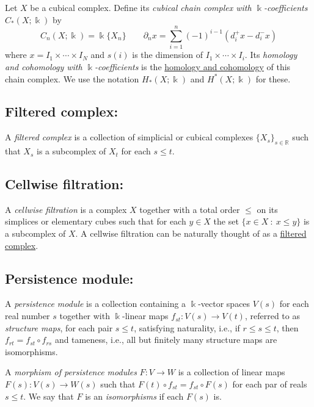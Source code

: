 \documentclass{amsart}
\begin{document}
	Let $X$ be a cubical complex. Define its \textit{cubical chain complex with $\Bbbk$-coefficients} $C_*(X; \Bbbk)$ by 
	\begin{equation*}
	C_n(X; \Bbbk) = \Bbbk\{X_n\} \qquad \partial_n x = \sum_{i = 1}^{n} (-1)^{i-1}(d^+_i x - d^-_i x)
	\end{equation*}
	where $x = I_1 \times \cdots \times I_N$ and $s(i)$ is the dimension of $I_1 \times \cdots \times I_i$.
	Its \textit{homology and cohomology with $\Bbbk$-coefficients} is the \hyperref[homology and cohomology]{homology and cohomology} of this chain complex. We use the notation $H_*(X; \Bbbk)$ and $H^*(X; \Bbbk)$ for these.
	
	\subsection*{Filtered complex:} \label{filtered complex}
	
	A \textit{filtered complex} is a collection of simplicial or cubical complexes $\{X_s\}_{s \in \mathbb R}$ such that $X_s$ is a subcomplex of $X_t$ for each $s \leq t$.
	
	\subsection*{Cellwise filtration:} \label{cellwise filtration}
	
	A \textit{cellwise filtration} is a complex $X$ together with a total order $\leq$ on its simplices or elementary cubes such that for each $y \in X$ the set $\{x \in X\ :\ x \leq y\}$ is a subcomplex of $X$. A cellwise filtration can be naturally thought of as a \hyperref[filtered complex]{filtered complex}.
	
	\subsection*{Persistence module:} \label{persistence module}
	
	A \textit{persistence module} is a collection containing a $\Bbbk$-vector spaces $V(s)$ for each real number $s$ together with $\Bbbk$-linear maps $f_{st} : V(s) \to V(t)$, referred to as \textit{structure maps}, for each pair $s \leq t$, satisfying	naturality, i.e., if $r \leq s \leq t$, then $f_{rt} = f_{st} \circ f_{rs}$ and tameness, i.e., all but finitely many structure maps are isomorphisms.
	
	A \textit{morphism of persistence modules} $F : V \to W$ is a collection of linear maps $F(s) : V(s) \to W(s)$ such that $F(t) \circ f_{st} = f_{st} \circ F(s)$ for each par of reals $s \leq t$.	We say that $F$ is an \textit{isomorphisms} if each $F(s)$ is.
	
\end{document}
